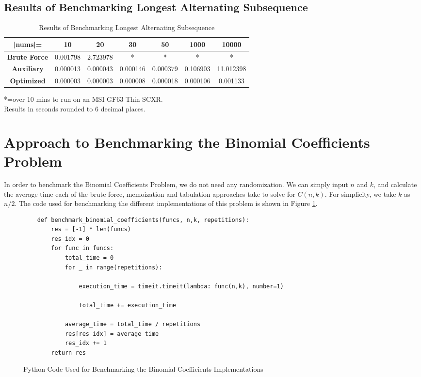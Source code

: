 \subsection{Results of Benchmarking Longest Alternating Subsequence}
\begin{table}[H]
    \centering
    \begin{tabular}{|c|c|c|c|c|c|c|}
        \hline
        \textbf{|nums|=}  & \textbf{10} & \textbf{20} & \textbf{30} & \textbf{50} & \textbf{1000}  & \textbf{10000} \\
        \hline
        \textbf{Brute Force} & 0.001798 & 2.723978 & * & * & * & * \\
        \hline
        \textbf{Auxiliary} & 0.000013 & 0.000043 & 0.000146 & 0.000379 & 0.106903 & 11.012398 \\
        \hline
        \textbf{Optimized} &  0.000003 & 0.000003 & 0.000008 & 0.000018 & 0.000106 & 0.001133 \\
        \hline
    \end{tabular}
    \caption{Results of Benchmarking Longest Alternating Subsequence}
\end{table}
*=over 10 mins to run on an MSI GF63 Thin SCXR.\\
Results in seconds rounded to 6 decimal places.


\section{Approach to Benchmarking the Binomial Coefficients Problem}
In order to benchmark the Binomial Coefficients Problem, we do not need any randomization. We can simply input $n$ and $k$, and calculate the average time each of the brute force, memoization and tabulation approaches take to solve for $C(n,k)$.
For simplicity, we take $k$ as $n/2$.
The code used for benchmarking the different implementations of this problem is shown in Figure \ref{fig:bm-binomial}.

\begin{figure}[H]
    \centering
    \begin{lstlisting}
    def benchmark_binomial_coefficients(funcs, n,k, repetitions):
        res = [-1] * len(funcs)
        res_idx = 0
        for func in funcs:
            total_time = 0
            for _ in range(repetitions):
    
                execution_time = timeit.timeit(lambda: func(n,k), number=1)
    
                total_time += execution_time
    
            average_time = total_time / repetitions
            res[res_idx] = average_time
            res_idx += 1
        return res
    \end{lstlisting}
    \caption{Python Code Used for Benchmarking the Binomial Coefficients Implementations}
    \label{fig:bm-binomial}
\end{figure}

